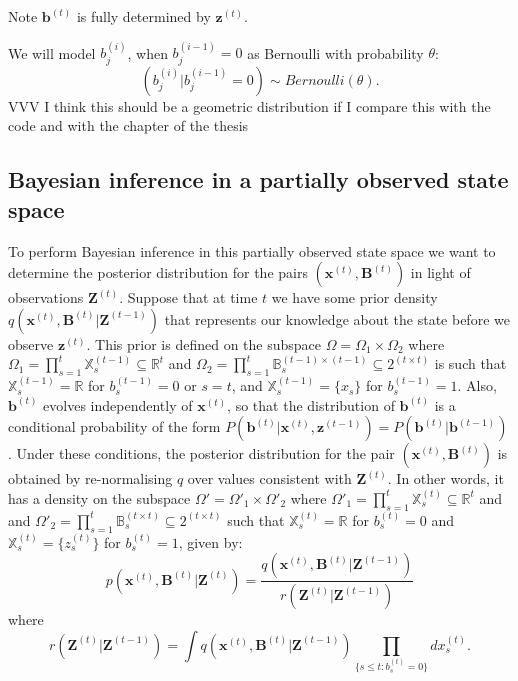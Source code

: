 \documentclass[11pt,a4paper]{article}
\renewcommand{\vec}[1]{\mathbf{#1}}
\begin{document}
Note $\vec{b}^{(t)}$ is fully determined by $\vec{z}^{(t)}$.

We will model $b_j^{(i)}$, when $b_j^{(i-1)} = 0$ as Bernoulli with probability $\theta$:
\[
(b_j^{(i)} | b_j^{(i-1)} = 0) \sim Bernoulli(\theta).
\]
{\color{red} VVV I think this should be a geometric distribution if I compare this with the code and with the chapter of the thesis}




\subsection{Bayesian inference in a partially observed state space}

To perform Bayesian inference in this partially observed state space we want to determine the posterior distribution for the pairs $(\vec{x}^{(t)}, \vec{B}^{(t)})$ in light of observations $\vec{Z}^{(t)}$. Suppose that at time $t$ we have some prior density $q(\vec{x}^{(t)},\vec{B}^{(t)} | \vec{Z}^{(t-1)})$ that represents our knowledge about the state before we observe $\vec{z}^{(t)}$. This prior is defined on the subspace $\Omega = \Omega_1 \times \Omega_2$ where $\Omega_1 = \prod_{s=1}^t \mathbb{X}_s^{(t-1)} \subseteq \mathbb{R}^t$ and $\Omega_2 = \prod_{s=1}^t \mathbb{B}_s^{(t-1) \times (t-1)} \subseteq 2^{(t \times t)}$ is such that $\mathbb{X}_s^{(t-1)} = \mathbb{R}$ for $b_s^{(t-1)} = 0$ or $s=t$, and $\mathbb{X}_s^{(t-1)} = \{ x_s \}$ for $b_s^{(t-1)} = 1$. Also, $\vec{b}^{(t)}$ evolves independently of $\vec{x}^{(t)}$, so that the distribution of $\vec{b}^{(t)}$ is a conditional probability of the form $P(\vec{b}^{(t)} | \vec{x}^{(t)}, \vec{z}^{(t-1)} ) = P( \vec{b}^{(t)} | \vec{b}^{(t-1)} )$. Under these conditions, the posterior distribution for the pair $(\vec{x}^{(t)}, \vec{B}^{(t)})$ is obtained by re-normalising $q$ over values consistent with $\vec{Z}^{(t)}$. In other words, it has a density on the subspace $\Omega' = \Omega'_1 \times \Omega'_2$ where $\Omega'_1 = \prod_{s=1}^t \mathbb{X}_s^{(t)} \subseteq \mathbb{R}^t$ and and $\Omega'_2 = \prod_{s=1}^t \mathbb{B}_s^{(t \times t)} \subseteq 2^{(t \times t)}$ such that $\mathbb{X}_s^{(t)} = \mathbb{R}$ for $b_s^{(t)} = 0$ and $\mathbb{X}_s^{(t)} = \{ z_s^{(t)}\}$ for $b_s^{(t)} = 1$, given by:
\[
p(\vec{x}^{(t)}, \vec{B}^{(t)} | \vec{Z}^{(t)})  =   
\frac{ q(\vec{x}^{(t)}, \vec{B}^{(t)}|\vec{Z}^{(t-1)})} {r(\vec{Z}^{(t)} | \vec{Z}^{(t-1)})}
\]
where 
\[
r(\vec{Z}^{(t)} | \vec{Z}^{(t-1)}) = \int q(\vec{x}^{(t)}, \vec{B}^{(t)}|\vec{Z}^{(t-1)}) \prod_{\{s \leq t: b_s^{(t)} = 0\}} dx_s^{(t)}.
\]
\end{document}
